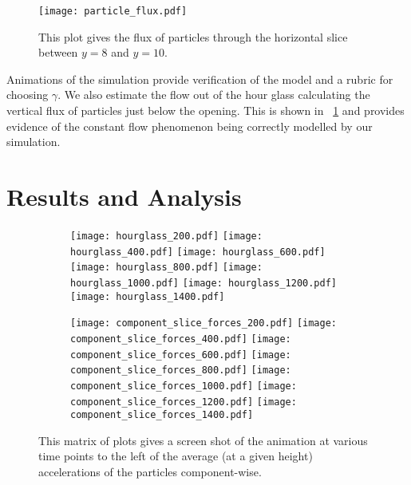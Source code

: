 \documentclass[12pt]{amsart}
\newcommand{\figref}[1]{\figurename~\ref{#1}}
\begin{document}
\begin{figure}[h]
\texttt{[image: particle\_flux.pdf]}
\caption{ This plot gives the flux of particles through the horizontal slice between $y=8$ and $y=10$. } 
\label{flux}
\end{figure}

Animations of the simulation provide verification of the model and a rubric for
choosing $\gamma$.  We also estimate the flow out of the hour glass calculating
the vertical flux of particles just below the opening.  This is shown in
\figref{flux} and provides evidence of the constant flow phenomenon being
correctly modelled by our simulation.

\section{Results and Analysis }
\begin{figure}[h]
\begin{subfigure}{.4\textwidth}
\texttt{[image: hourglass\_200.pdf]}
\texttt{[image: hourglass\_400.pdf]}
\texttt{[image: hourglass\_600.pdf]}
\texttt{[image: hourglass\_800.pdf]}
\texttt{[image: hourglass\_1000.pdf]}
\texttt{[image: hourglass\_1200.pdf]}
\texttt{[image: hourglass\_1400.pdf]}
\end{subfigure}
\begin{subfigure}{.55\textwidth}
\texttt{[image: component\_slice\_forces\_200.pdf]}
\texttt{[image: component\_slice\_forces\_400.pdf]}
\texttt{[image: component\_slice\_forces\_600.pdf]}
\texttt{[image: component\_slice\_forces\_800.pdf]}
\texttt{[image: component\_slice\_forces\_1000.pdf]}
\texttt{[image: component\_slice\_forces\_1200.pdf]}
\texttt{[image: component\_slice\_forces\_1400.pdf]}
\end{subfigure}
\caption{ This matrix of plots gives a screen shot of the animation at various
time points to the left of the average (at a given height) accelerations of the
particles component-wise. }
\label{animation}
\end{figure}
\end{document}
